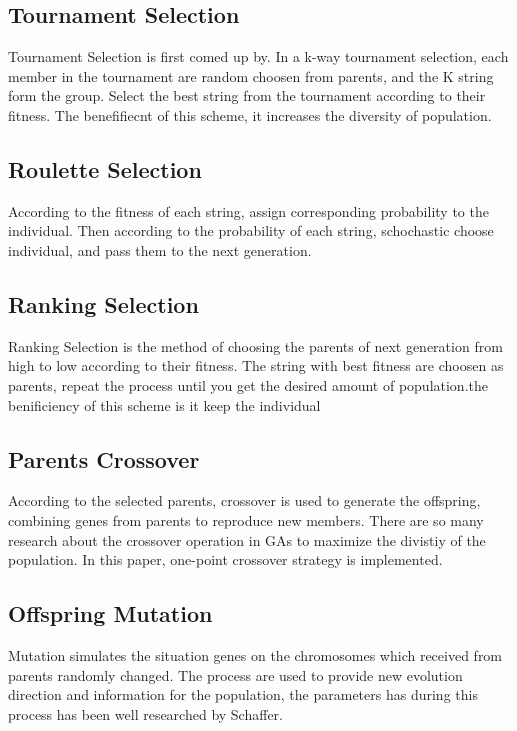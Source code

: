 \documentclass[smallextended]{svjour3}       %
\begin{document}
\begin{multicols}{2}
\subsection{Tournament Selection}
Tournament Selection is first comed up by. In a k-way tournament selection,
each member in the tournament are random choosen from parents, and the K string
form the group. Select the best string from the tournament according to their
fitness. The benefifiecnt of this scheme, it increases the diversity of
population. 
\subsection{Roulette Selection}
According to the fitness of each string, assign corresponding probability to the
individual. Then according to the probability of each string, schochastic choose
individual, and pass them to the next generation.
\subsection{Ranking Selection}
Ranking Selection is the method of choosing the parents of next generation from
high to low according to their fitness. The string with best fitness are choosen
as parents, repeat the process until you get the desired amount of
population.the benificiency of this scheme is it keep the individual 


\subsection{Parents Crossover}
According to the selected parents, crossover is used to generate the offspring,
combining genes from parents to reproduce new members. There are so many
research \cite{ahmed2010genetic,nebro2009mocell} about the crossover operation
in GAs to maximize the divistiy of the population. In this paper, one-point
crossover strategy is implemented.

\subsection{Offspring Mutation}
Mutation simulates the situation  genes on the chromosomes which received from
parents randomly changed.  The process are used to provide new evolution
direction and information for the population, the parameters has during this
process has been well researched by Schaffer\cite{schaffer1989study}.  



\end{multicols}
\end{document}
